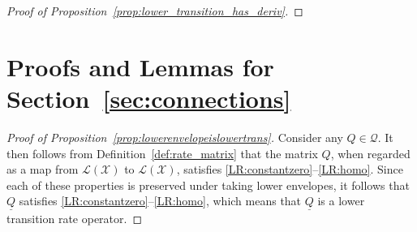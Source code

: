 \documentclass[10pt,a4paper]{paper}
\theoremstyle{definition}
\newcommand{\reals}{\mathbb{R}}
\newcommand{\realspos}{\reals_{>0}}
\newcommand{\states}{\mathcal{X}}
\newcommand{\gambles}{\mathcal{L}}
\newcommand{\gamblesX}{\gambles(\states)}
\newcommand{\rateset}{\mathcal{Q}}
\newcommand{\lrate}{\underline{Q}}
\newcommand{\norm}[1]{\left\lVert #1 \right\rVert}
\begin{document}
\begin{proof}[Proof of Proposition~\ref{prop:lower_transition_has_deriv}]
\end{proof}

\section{Proofs and Lemmas for Section~\ref{sec:connections}}

\begin{proof}[Proof of Proposition~\ref{prop:lowerenvelopeislowertrans}]
Consider any $Q\in\rateset$. It then follows from Definition~\ref{def:rate_matrix} that the matrix $Q$, when regarded as a map from $\gamblesX$ to $\gamblesX$, satisfies \ref{LR:constantzero}--\ref{LR:homo}. Since each of these properties is preserved under taking lower envelopes, it follows that $\lrate$ satisfies \ref{LR:constantzero}--\ref{LR:homo}, which means that $\lrate$ is a lower transition rate operator.
\end{proof}
\end{document}

